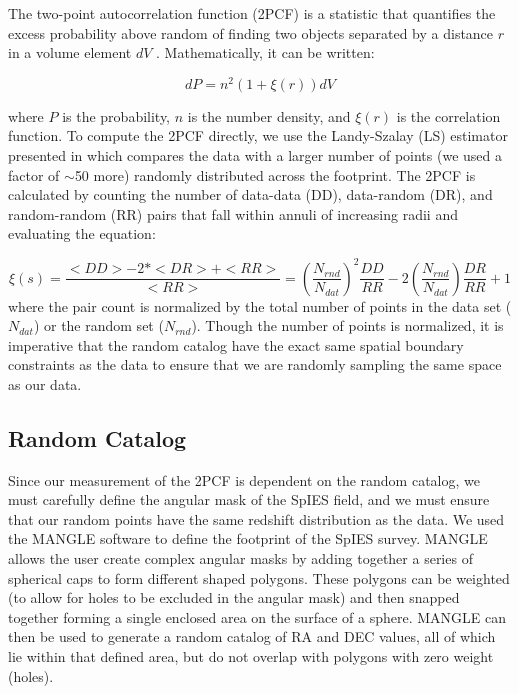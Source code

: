 \documentclass[onecolumn]{emulateapj}
\begin{document}
The two-point autocorrelation function (2PCF) is a statistic that quantifies the excess probability above random of finding two objects separated by a distance $r$ in a volume element $dV$ \citep{Peebles1980}. Mathematically, it can be written:

\begin{equation}
dP = n^2 (1+\xi(r))dV
\end{equation}

where $P$ is the probability, $n$ is the number density, and $\xi(r)$ is the correlation function. To compute the 2PCF directly, we use the Landy-Szalay (LS) estimator presented in \citet{Landy1993} which compares the data with a larger number of points (we used a factor of $\sim$50 more) randomly distributed across the footprint. The 2PCF is calculated by counting the number of data-data (DD), data-random (DR), and random-random (RR) pairs that fall within annuli of increasing radii and evaluating the equation:

\begin{equation}
\xi(s) = \frac{<DD>-2*<DR>+<RR>}{<RR>} = \left(\frac{N_{rnd}}{N_{dat}}\right)^2\frac{DD}{RR} - 2\left(\frac{N_{rnd}}{N_{dat}}\right)\frac{DR}{RR}+1
\end{equation}\label{LS_EST}
where the pair count is normalized by the total number of points in the data set ($N_{dat}$) or the random set ($N_{rnd}$). Though the number of points is normalized, it is imperative that the random catalog have the exact same spatial boundary constraints as the data to ensure that we are randomly sampling the same space as our data.

\subsection{Random Catalog}
Since our measurement of the 2PCF is dependent on the random catalog, we must carefully define the angular mask of the SpIES field, and we must ensure that our random points have the same redshift distribution as the data. We used the MANGLE software \citep{Swanson2008} to define the footprint of the SpIES survey. MANGLE allows the user create complex angular masks by adding together a series of spherical caps to form different shaped polygons. These polygons can be weighted (to allow for holes to be excluded in the angular mask) and then snapped together forming a single enclosed area on the surface of a sphere. MANGLE can then be used to generate a random catalog of RA and DEC values, all of which lie within that defined area, but do not overlap with polygons with zero weight (holes).
\end{document}
